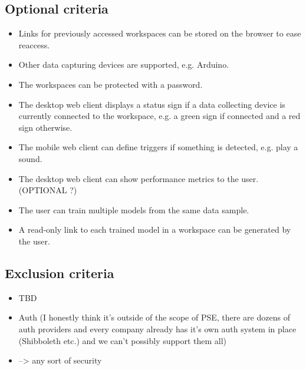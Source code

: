 \subsection{Optional criteria}
\begin{itemize}
    \item Links for previously accessed workspaces can be stored on the browser to ease reaccess.
    \item Other data capturing devices are supported, e.g. Arduino.
    \item The workspaces can be protected with a password.
    \item The desktop web client displays a status sign if a data collecting device is currently connected to the workspace, e.g. a green sign if connected and a red sign otherwise.
    \item The mobile web client can define triggers if something is detected, e.g. play a sound.
    \item The desktop web client can show performance metrics to the user. (OPTIONAL ?)
    \item The user can train multiple models from the same data sample.
    \item A read-only link to each trained model in a workspace can be generated by the user.
\end{itemize}

\subsection{Exclusion criteria}
\begin{itemize}
    \item TBD
    \item Auth (I honestly think it's outside of the scope of PSE, there are dozens of auth providers and every company already has it's own auth system in place (Shibboleth etc.) and we can't possibly support them all)
    \item --> any sort of security
\end{itemize}
